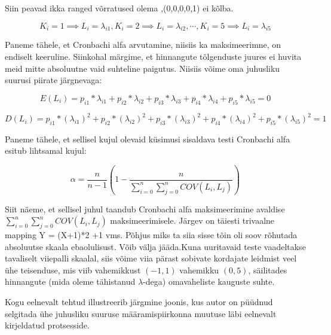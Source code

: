 \documentclass[a4paper]{article}
\begin{document}
{\color{cyan} Siin peavad ikka ranged võrratused olema ,(0,0,0,0,1) ei kõlba.}

\begin{equation*}
K_i = 1 \implies L_i = \lambda_{i1}, K_i = 2 \implies L_i = \lambda_{i2},\cdots, K_i = 5 \implies L_i =\lambda_{i5}
\end{equation*}

Paneme tähele, et Cronbachi alfa arvutamine, niisiis ka maksimeerimne, on endiselt keeruline. Siinkohal märgime, et hinnangute tõlgenduste juures ei huvita meid mitte absoluutne vaid suhteline paigutus. Niisiis võime oma juhusliku suurusi piirate järgnevaga:


\begin{equation}
E(L_i) = p_{i1}*\lambda_{i1}+p_{i2}*\lambda_{i2}+p_{i3}*\lambda_{i3}+
p_{i4}*\lambda_{i4}+p_{i5}*\lambda_{i5}=0
\end{equation}

\begin{equation}
D(L_i) = 
p_{i1}*(\lambda_{i1})^2+ p_{i2}*(\lambda_{i2})^2 + p_{i3}*(\lambda_{i3})^2 + p_{i4}*(\lambda_{i4})^2 + p_{i5}*(\lambda_{i5})^2 = 1 
\end{equation}


Paneme tähele, et sellisel kujul olevaid k\"usimusi sisaldava testi Cronbachi alfa esitub lihtsamal kujul:

\begin{equation}
\alpha = \frac{n}{n-1}\left(1 - \frac
{n}{\sum \limits_{i=0}^n \sum \limits_{j=0}^n COV(L_i,L_j)}\right)
\end{equation}

Siit näeme, et sellisel juhul taandub Cronbachi alfa maksimeerimine avaldise $\sum \limits_{i=0}^n \sum \limits_{j=0}^n COV(L_i,L_j)$ maksimeerimisele. {\color{cyan} Järgev on täiesti trivaalne mapping Y = (X+1)*2 +1 vms. Põhjus miks ta siia sisse tõin oli soov rõhutada absoluutse skaala ebaolulisust. Võib välja jääda.}Kuna uuritavaid teste vaadeltakse tavaliselt viiepalli skaalal, siis võime viia pärast sobivate kordajate leidmist veel \"uhe teisenduse, mis viib vahemikkust $(-1,1)$ vahemikku $(0,5)$, säilitades hinnangute (mida oleme tähistanud $\lambda$-dega) omavaheliste kauguste suhte. 

Kogu eelnevalt tehtud illustreerib järgmine joonis, kus autor on p\"u\"udnud selgitada \"uhe juhusliku suuruse määramispiirkonna muutuse läbi eelnevalt kirjeldatud protsesside. 
\end{document}
